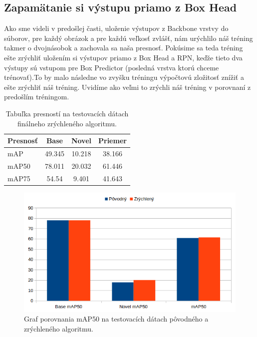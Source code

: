 \subsection{Zapamätanie si výstupu priamo z Box Head}

Ako sme videli v predošlej časti, uloženie výstupov z Backbone vrstvy do súborov, pre každý obrázok a pre každú veľkosť zvlášť, nám urýchlilo náš tréning takmer o dvojnásobok a zachovala sa naša presnosť. Pokúsime sa teda tréning ešte zrýchliť uložením si výstupov priamo z Box Head a RPN, keďže tieto dva výstupy sú vstupom pre Box Predictor (posledná vrstva ktorú chceme trénovať).To by malo následne vo zvyšku tréningu výpočtovú zložitosť znížiť a ešte zrýchliť náš tréning. Uvidíme ako veľmi to zrýchli náš tréning v porovnaní z predošlím tréningom. 

\begin{table}[H]
\begin{tabular}{|l|c|c|c|}
\hline
\textbf{Presnosť} & \textbf{Base} & \textbf{Novel} & \textbf{Priemer} \\
\hline
mAP & 49.345 & 10.218 & 38.166 \\
mAP50 & 78.011 & 20.032 & 61.446 \\
mAP75 & 54.54 & 9.401 & 41.643 \\
\hline
\end{tabular}
\centering
\caption{Tabuľka presností na testovacích dátach finálneho zrýchleného algoritmu.}
\label{tab:table56}
\end{table}

\begin{figure}[H]
\centering
\includegraphics[width=\textwidth]{images/fastest_chart.png}
\caption{Graf porovnania mAP50 na testovacích dátach pôvodného a zrýchleného algoritmu.}
\label{fig:image17}
\end{figure}

